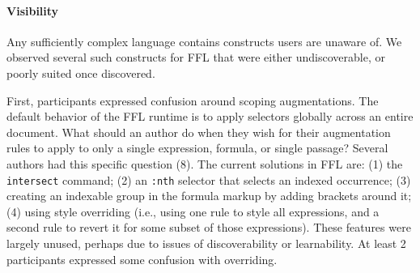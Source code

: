 


\paragraph{Visibility}
Any sufficiently complex language contains constructs users are unaware of. We observed several such constructs for FFL that were either undiscoverable, or poorly suited once discovered.

First, participants expressed confusion around scoping augmentations. The default behavior of the FFL runtime is to apply selectors globally across an entire document. What should an author do when they wish for their augmentation rules to apply to only a single expression, formula, or single passage? Several authors had this specific question (8). The current solutions in FFL are: (1) the \texttt{intersect} command; (2) an \texttt{:nth} selector that selects an indexed occurrence; (3) creating an indexable group in the formula markup by adding brackets around it; (4) using style overriding (i.e., using one rule to style all expressions, and a second rule to revert it for some subset of those expressions). These features were largely unused, perhaps due to issues of discoverability or learnability. At least 2 participants expressed some confusion with overriding.

